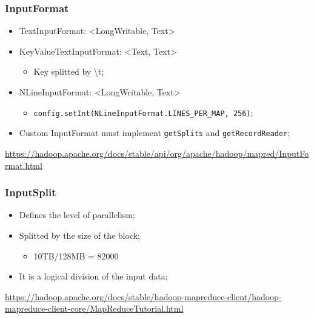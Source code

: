 \documentclass[aspectratio=169]{beamer}
\begin{document}
\begin{frame}
	\frametitle{InputFormat}

	\begin{itemize}
		\item TextInputFormat: <LongWritable, Text>
		\item KeyValueTextInputFormat: <Text, Text>
		      \begin{itemize}
			      \item Key splitted by \textbackslash t;
		      \end{itemize}
		\item NLineInputFormat: <LongWritable, Text>
		      \begin{itemize}
			      \item {\scriptsize \texttt{config.setInt(NLineInputFormat.LINES\_PER\_MAP, 256)}};
		      \end{itemize}
		\item Custom InputFormat must implement \texttt{getSplits} and \texttt{getRecordReader};
	\end{itemize}

	\begin{center}
		{\tiny \href{https://hadoop.apache.org/docs/stable/api/org/apache/hadoop/mapred/InputFormat.html}{https://hadoop.apache.org/docs/stable/api/org/apache/hadoop/mapred/InputFormat.html}}
	\end{center}
\end{frame}

\begin{frame}
	\frametitle{InputSplit}

	\begin{itemize}
		\item Defines the level of parallelism;
		\item Splitted by the size of the block;
		      \begin{itemize}
			      \item 10TB/128MB = 82000
		      \end{itemize}
		\item It is a logical division of the input data;
	\end{itemize}

	\begin{center}
		{\tiny \href{https://hadoop.apache.org/docs/stable/hadoop-mapreduce-client/hadoop-mapreduce-client-core/MapReduceTutorial.html}{https://hadoop.apache.org/docs/stable/hadoop-mapreduce-client/hadoop-mapreduce-client-core/MapReduceTutorial.html}}
	\end{center}
\end{frame}
\end{document}
